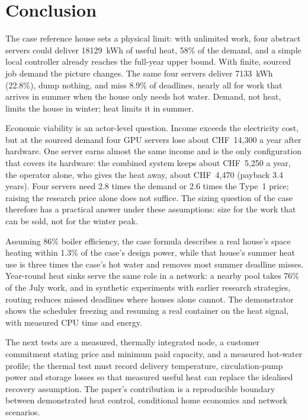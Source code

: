 \section{Conclusion}
\label{sec:conclusion}

The case reference house sets a physical limit: with unlimited work, four abstract servers could
deliver \qty{18129}{kWh} of useful heat, 58\% of the demand, and a simple local controller already
reaches the full-year upper bound. With finite, sourced job demand the picture changes. The same
four servers deliver \qty{7133}{kWh} (22.8\%), dump nothing, and miss 8.9\% of deadlines, nearly
all for work that arrives in summer when the house only needs hot water. Demand, not heat, limits
the house in winter; heat limits it in summer.

Economic viability is an actor-level question. Income exceeds the electricity cost, but at the sourced demand four GPU servers
lose about CHF~14,300 a year after hardware. One server earns almost the same income and is the
only configuration that covers its hardware: the combined system keeps about CHF~5,250 a year, the
operator alone, who gives the heat away, about CHF~4,470 (payback 3.4 years). Four servers need 2.8 times the demand or 2.6 times
the Type~1 price; raising the research price alone does not suffice. The sizing question of the
case therefore has a practical answer under these assumptions: size for the work that can be sold,
not for the winter peak.

Assuming 86\% boiler efficiency, the case formula describes a real house's space heating within
1.3\% of the case's design power,
while that house's summer heat use is three times the case's hot water and removes most summer
deadline misses. Year-round heat sinks serve the same role in a network: a nearby pool takes 76\%
of the July work, and in synthetic experiments with earlier research strategies, routing reduces missed deadlines where houses alone
cannot. The demonstrator shows the scheduler freezing and resuming a real container on the heat
signal, with measured CPU time and energy.

The next tests are a measured, thermally integrated node, a customer commitment stating price and
minimum paid capacity, and a measured hot-water profile; the thermal test must record delivery
temperature, circulation-pump power and storage losses so that measured useful heat can replace
the idealised recovery assumption. The paper's contribution is a reproducible boundary between
demonstrated heat control, conditional home economics and network scenarios.
